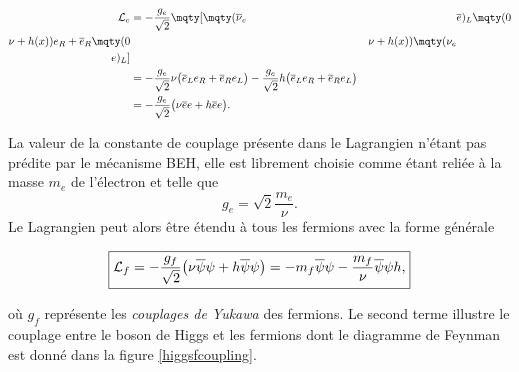        \begin{align*}
             \mathcal{L}_e & = -\frac{g_e}{\sqrt{2}}\mqty[\mqty(\overline{\nu}_e&&\overline{e})_L\mqty(0\\\nu+h(x))e_R+\overline{e}_R\mqty(0&&\nu+h(x))\mqty(\nu_e\\e)_L] \vspace{5pt} \\
             & = -\frac{g_e}{\sqrt{2}}\nu\bigl(\overline{e}_Le_R+\overline{e}_Re_L\bigr)-\frac{g_e}{\sqrt{2}}h\bigl(\overline{e}_Le_R+\overline{e}_Re_L\bigr) \vspace{5pt} \\
             & = -\frac{g_e}{\sqrt{2}}\bigl(\nu\overline{e}e+h\overline{e}e\bigr).
        \end{align*}

        La valeur de la constante de couplage présente dans le Lagrangien n'étant pas prédite par le mécanisme BEH, elle est librement choisie comme étant reliée à la masse $m_e$ de l'électron et telle que $$g_e=\sqrt{2}\frac{m_e}{\nu}.$$ Le Lagrangien peut alors être étendu à tous les fermions avec la forme générale

        \begin{equation}
        \boxed{
            \mathcal{L}_f=-\frac{g_f}{\sqrt{2}}\bigl(\nu\overline{\psi}\psi+h\overline{\psi}\psi\bigr) \vspace{5pt}=-m_f\overline{\psi}\psi-\frac{m_f}{\nu}\overline{\psi}\psi h
        ,}
        \label{yukawacoupling}
        \end{equation}

        où $g_f$ représente les \textit{couplages de Yukawa} des fermions. Le second terme illustre le couplage entre le boson de Higgs et les fermions dont le diagramme de Feynman est donné dans la figure \ref{higgsfcoupling}.



        
